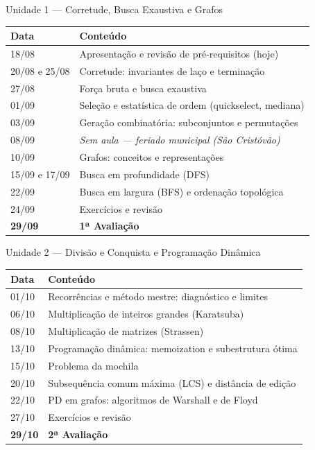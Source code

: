 \documentclass[aspectratio=169]{beamer}
\begin{document}
\begin{frame}[shrink]{Unidade 1 --- Corretude, Busca Exaustiva e Grafos}
  \begin{center}
  \renewcommand{\arraystretch}{1.25}
  \small
  \begin{tabular}{ll}
    \toprule
    \textbf{Data} & \textbf{Conteúdo} \\
    \midrule
    18/08 & Apresentação e revisão de pré-requisitos (hoje) \\
    20/08 e 25/08 & Corretude: invariantes de laço e terminação \\
    27/08 & Força bruta e busca exaustiva \\
    01/09 & Seleção e estatística de ordem (quickselect, mediana) \\
    03/09 & Geração combinatória: subconjuntos e permutações \\
    08/09 & \emph{Sem aula --- feriado municipal (São Cristóvão)} \\
    10/09 & Grafos: conceitos e representações \\
    15/09 e 17/09 & Busca em profundidade (DFS) \\
    22/09 & Busca em largura (BFS) e ordenação topológica \\
    24/09 & Exercícios e revisão \\
    \textbf{29/09} & \textbf{1ª Avaliação} \\
    \bottomrule
  \end{tabular}
  \end{center}
\end{frame}

\begin{frame}{Unidade 2 --- Divisão e Conquista e Programação Dinâmica}
  \begin{center}
  \renewcommand{\arraystretch}{1.25}
  \small
  \begin{tabular}{ll}
    \toprule
    \textbf{Data} & \textbf{Conteúdo} \\
    \midrule
    01/10 & Recorrências e método mestre: diagnóstico e limites \\
    06/10 & Multiplicação de inteiros grandes (Karatsuba) \\
    08/10 & Multiplicação de matrizes (Strassen) \\
    13/10 & Programação dinâmica: memoization e subestrutura ótima \\
    15/10 & Problema da mochila \\
    20/10 & Subsequência comum máxima (LCS) e distância de edição \\
    22/10 & PD em grafos: algoritmos de Warshall e de Floyd \\
    27/10 & Exercícios e revisão \\
    \textbf{29/10} & \textbf{2ª Avaliação} \\
    \bottomrule
  \end{tabular}
  \end{center}
\end{frame}
\end{document}

